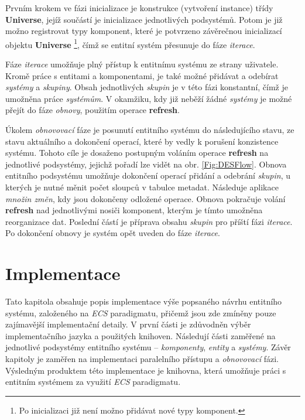 Prvním krokem ve fázi inicializace je konstrukce (vytvoření instance) třídy \textbf{Universe}, jejíž součástí je inicializace jednotlivých podsystémů. Potom je již možno registrovat typy komponent, které je potvrzeno závěrečnou inicializací objektu \textbf{Universe} \footnote{Po inicializaci již není možno přidávat nové typy komponent.}, čímž se entitní systém přesunuje do fáze \emph{iterace}. 

Fáze \emph{iterace} umožňuje plný přístup k entitnímu systému ze strany uživatele. Kromě práce s entitami a komponentami, je také možné přidávat a odebírat \emph{systémy} a \emph{skupiny}. Obsah jednotlivých \emph{skupin} je v této fázi konstantní, čímž je umožněna práce \emph{systémům}. V okamžiku, kdy již neběží žádné \emph{systémy} je možné přejít do fáze \emph{obnovy}, použitím operace \textbf{refresh}.

Úkolem \emph{obnovovací} fáze je posunutí entitního systému do následujícího stavu, ze stavu aktuálního a dokončení operací, které by vedly k porušení konzistence systému. Tohoto cíle je dosaženo postupným voláním operace \textbf{refresh} na jednotlivé podsystémy, jejichž pořadí lze vidět na obr. \ref{Fig:DESFlow}. Obnova entitního podsystému umožňuje dokončení operací přidání a odebrání \emph{skupin}, u kterých je nutné měnit počet sloupců v tabulce metadat. Následuje aplikace \emph{množin změn}, kdy jsou dokončeny odložené operace. Obnova pokračuje volání \textbf{refresh} nad jednotlivými nosiči komponent, kterým je tímto umožněna reorganizace dat. Poslední částí je příprava obsahu \emph{skupin} pro příští fázi \emph{iterace}. Po dokončení obnovy je systém opět uveden do fáze \emph{iterace}.

\chapter{Implementace}
\label{Chap:Implementation}

Tato kapitola obsahuje popis implementace výše popsaného návrhu entitního systému, založeného na \emph{ECS} paradigmatu, přičemž jsou zde zmíněny pouze zajímavější implementační detaily. V první části je zdůvodněn výběr implementačního jazyka a použitých knihoven. Následují části zaměřené na jednotlivé podsystémy entitního systému -- \emph{komponenty}, \emph{entity} a \emph{systémy}. Závěr kapitoly je zaměřen na implementaci paralelního přístupu a \emph{obnovovací} fázi. Výsledným produktem této implementace je knihovna, která umožňuje práci s entitním systémem za využití \emph{ECS} paradigmatu. 

